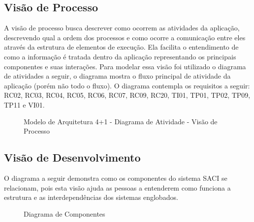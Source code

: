 \documentclass[12pt]{article}
\begin{document}
\vfill%
\pagebreak%

\subsection{Visão de Processo}

A visão de processo busca descrever como ocorrem as atividades da aplicação, descrevendo qual a ordem dos processos e como ocorre a comunicação entre eles através da estrutura de elementos de execução. Ela facilita o entendimento de como a informação é tratada dentro da aplicação representando os principais componentes e suas interações.
Para modelar essa visão foi utilizado o diagrama de atividades a seguir, o diagrama mostra o fluxo principal de atividade da aplicação (porém não todo o fluxo). O diagrama contempla os requisitos a seguir: RC02, RC03, RC04, RC05, RC06, RC07, RC09, RC20, TI01, TP01, TP02, TP09, TP11 e VI01.

\begin{figure}[!h]
    \caption{\label{fig:processView} Modelo de Arquitetura 4+1 - Diagrama de Atividade - Visão de Processo}
\end{figure}

\vfill%
\pagebreak%

\subsection{Visão de Desenvolvimento}

O diagrama a seguir demonstra como os componentes do sistema SACI se relacionam, pois esta visão ajuda as pessoas a entenderem como funciona a estrutura e as interdependências dos sistemas englobados.

  \begin{figure}[!htb]
    \caption{\label{fig:diagComponentes} Diagrama de Componentes}
  \end{figure}
\end{document}
